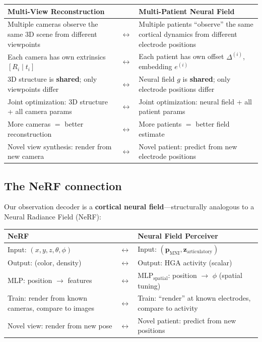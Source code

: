 \documentclass[11pt,letterpaper]{article}
\newcommand{\bfp}{\mathbf{p}}
\newcommand{\bfz}{\mathbf{z}}
\begin{document}
\begin{table}[ht]\centering\small
\begin{tabular}{@{}p{}p{}p{}@{}}
\toprule
\textbf{Multi-View Reconstruction} & & \textbf{Multi-Patient Neural Field} \\
\midrule
Multiple cameras observe the same 3D scene from different viewpoints & $\leftrightarrow$ & Multiple patients ``observe'' the same cortical dynamics from different electrode positions \\[6pt]
Each camera has own extrinsics $[R_i \mid t_i]$ & $\leftrightarrow$ & Each patient has own offset $\Delta^{(i)}$, embedding $e^{(i)}$ \\[6pt]
3D structure is \textbf{shared}; only viewpoints differ & $\leftrightarrow$ & Neural field $g$ is \textbf{shared}; only electrode positions differ \\[6pt]
Joint optimization: 3D structure + all camera params & $\leftrightarrow$ & Joint optimization: neural field + all patient params \\[6pt]
More cameras $=$ better reconstruction & $\leftrightarrow$ & More patients $=$ better field estimate \\[6pt]
Novel view synthesis: render from new camera & $\leftrightarrow$ & Novel patient: predict from new electrode positions \\
\bottomrule
\end{tabular}
\end{table}

\subsection{The NeRF connection}

Our observation decoder is a \textbf{cortical neural field}---structurally analogous to a Neural Radiance Field (NeRF):

\begin{table}[ht]\centering\small
\begin{tabular}{@{}p{}p{}p{}@{}}
\toprule
\textbf{NeRF} & & \textbf{Neural Field Perceiver} \\
\midrule
Input: $(x,y,z, \theta,\phi)$ & $\leftrightarrow$ & Input: $(\bfp_{\text{MNI}}, \bfz_{\text{articulatory}})$ \\[3pt]
Output: (color, density) & $\leftrightarrow$ & Output: HGA activity (scalar) \\[3pt]
MLP: position $\to$ features & $\leftrightarrow$ & $\text{MLP}_{\text{spatial}}$: position $\to$ $\phi$ (spatial tuning) \\[3pt]
Train: render from known cameras, compare to images & $\leftrightarrow$ & Train: ``render'' at known electrodes, compare to activity \\[3pt]
Novel view: render from new pose & $\leftrightarrow$ & Novel patient: predict from new positions \\
\bottomrule
\end{tabular}
\end{table}
\end{document}
